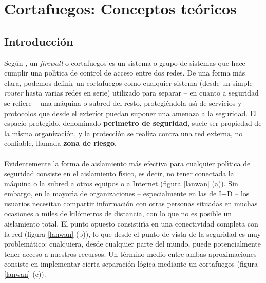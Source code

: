 \chapter{Cortafuegos: Conceptos te\'oricos}
\section{Introducci\'on}
Seg\'un \cite{kn:firefaq}, un {\it firewall} o cortafuegos es un sistema o 
grupo de sistemas que hace cumplir una pol\'{\i}tica de control de acceso
entre dos redes. De una forma m\'as clara, podemos definir un cortafuegos como 
cualquier sistema (desde un simple {\it router} hasta varias redes en serie) 
utilizado para separar -- en cuanto a seguridad se refiere --
una m\'aquina o subred del resto, protegi\'endola as\'{\i} de servicios y 
protocolos que desde el exterior puedan suponer una amenaza a la seguridad. El
espacio protegido, denominado {\bf per\'{\i}metro de seguridad}, suele ser 
propiedad de la misma organizaci\'on, y la protecci\'on se realiza contra una 
red externa, no confiable, llamada {\bf zona de riesgo}.\\
\\Evidentemente la forma de aislamiento m\'as efectiva para cualquier 
pol\'{\i}tica de seguridad consiste en el aislamiento f\'{\i}sico, es decir, no
tener conectada la m\'aquina o la subred a otros equipos o a Internet (figura
\ref{lanwan} (a)). Sin embargo, en la mayor\'{\i}a de organizaciones --
especialmente en las de I+D -- los usuarios
necesitan compartir informaci\'on con otras personas situadas en muchas 
ocasiones a miles de kil\'ometros de distancia, con lo que no es posible un 
aislamiento total. El punto opuesto consistir\'{\i}a en una conectividad 
completa con la red (figura \ref{lanwan} (b)), lo que desde el punto de vista 
de la seguridad es muy
problem\'atico: cualquiera, desde cualquier parte del mundo, puede 
potencialmente tener acceso a nuestros recursos. Un t\'ermino medio entre ambas 
aproximaciones consiste en implementar cierta separaci\'on l\'ogica mediante un 
cortafuegos (figura \ref{lanwan} (c)).\\
